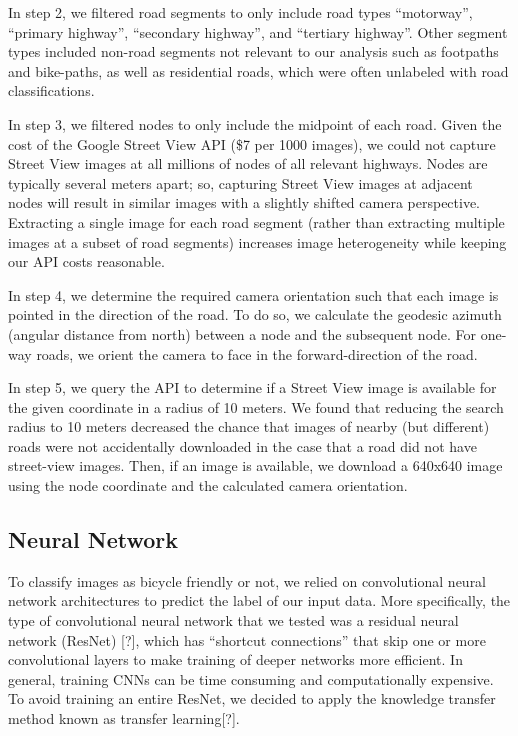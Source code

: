\documentclass[10pt,twocolumn,letterpaper]{article}
\begin{document}
In step 2, we filtered road segments to only include road types ``motorway'', ``primary highway'', ``secondary highway'', and ``tertiary highway''. Other segment types included non-road segments not relevant to our analysis such as footpaths and bike-paths, as well as residential roads, which were often unlabeled with road classifications.

In step 3, we filtered nodes to only include the midpoint of each road. Given the cost of the Google Street View API (\$7 per 1000 images), we could not capture Street View images at all millions of nodes of all relevant highways. Nodes are typically several meters apart; so, capturing Street View images at adjacent nodes will result in similar images with a slightly shifted camera perspective. Extracting a single image for each road segment (rather than extracting multiple images at a subset of road segments) increases image heterogeneity while keeping our API costs reasonable.

In step 4, we determine the required camera orientation such that each image is pointed in the direction of the road. To do so, we calculate the geodesic azimuth (angular distance from north) between a node and the subsequent node. For one-way roads, we orient the camera to face in the forward-direction of the road.

In step 5, we query the API to determine if a Street View image is available for the given coordinate in a radius of 10 meters. We found that reducing the search radius to 10 meters decreased the chance that images of nearby (but different) roads were not accidentally downloaded in the case that a road did not have street-view images. Then, if an image is available, we download a 640x640 image using the node coordinate and the calculated camera orientation.

\subsection{Neural Network}
To classify images as bicycle friendly or not, we relied on convolutional neural network architectures to predict the label of our input data. More specifically, the type of convolutional neural network that we tested was a residual neural network (ResNet) [?], which has “shortcut connections” that skip one or more convolutional layers to make training of deeper networks more efficient. In general, training CNNs can be time consuming and computationally expensive. To avoid training an entire ResNet, we decided to apply the knowledge transfer method known as transfer learning[?].
\end{document}
